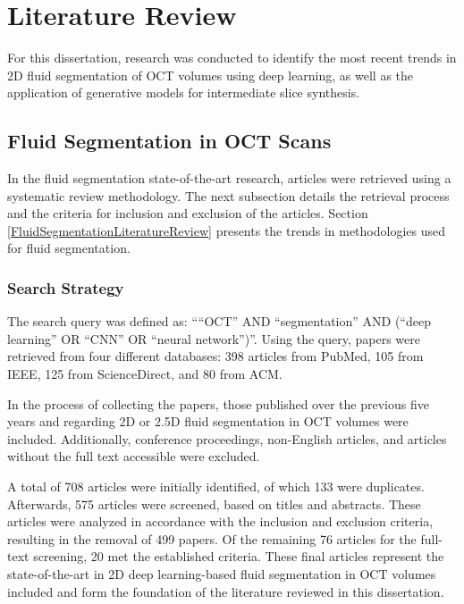 \chapter{Literature Review}\label{LiteratureReview}
For this dissertation, research was conducted to identify the most recent trends in 2D fluid segmentation of OCT volumes using deep learning, as well as the application of generative models for intermediate slice synthesis.
\section{Fluid Segmentation in OCT Scans}
In the fluid segmentation state-of-the-art research, articles were retrieved using a systematic review methodology. The next subsection details the retrieval process and the criteria for inclusion and exclusion of the articles. Section \ref{FluidSegmentationLiteratureReview} presents the trends in methodologies used for fluid segmentation.
\subsection{Search Strategy}\label{SearchStrategy}
The search query was defined as: ````OCT'' AND ``segmentation'' AND (``deep learning'' OR ``CNN'' OR ``neural network'')''. Using the query, papers were retrieved from four different databases: 398 articles from PubMed, 105 from IEEE, 125 from ScienceDirect, and 80 from ACM.
\par
In the process of collecting the papers, those published over the previous five years and regarding 2D or 2.5D fluid segmentation in OCT volumes were included. Additionally, conference proceedings, non-English articles, and articles without the full text accessible were excluded.
\par
A total of 708 articles were initially identified, of which 133 were duplicates. Afterwards, 575 articles were screened, based on titles and abstracts. These articles were analyzed in accordance with the inclusion and exclusion criteria, resulting in the removal of 499 papers. Of the remaining 76 articles for the full-text screening, 20 met the established criteria. These final articles represent the state-of-the-art in 2D deep learning-based fluid segmentation in OCT volumes included and form the foundation of the literature reviewed in this dissertation.

